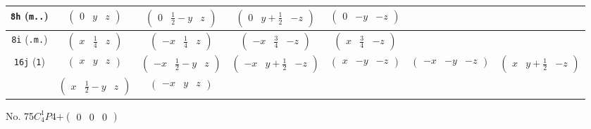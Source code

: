 \documentclass[fleqn,9pt,landscape]{jsarticle}
\begin{document}
\begin{center}
\begin{longtable}{ccccccc}
{\tt 8h} ({\tt m..}) & $ \begin{pmatrix} 0 & y & z \end{pmatrix} $ & $ \begin{pmatrix} 0 & \frac{1}{2} - y & z \end{pmatrix} $ & $ \begin{pmatrix} 0 & y + \frac{1}{2} & - z \end{pmatrix} $ & $ \begin{pmatrix} 0 & - y & - z \end{pmatrix} $ & $  $ & $  $ \\ \hline
{\tt 8i} ({\tt .m.}) & $ \begin{pmatrix} x & \frac{1}{4} & z \end{pmatrix} $ & $ \begin{pmatrix} - x & \frac{1}{4} & z \end{pmatrix} $ & $ \begin{pmatrix} - x & \frac{3}{4} & - z \end{pmatrix} $ & $ \begin{pmatrix} x & \frac{3}{4} & - z \end{pmatrix} $ & $  $ & $  $ \\ \hline
{\tt 16j} ({\tt 1}) & $ \begin{pmatrix} x & y & z \end{pmatrix} $ & $ \begin{pmatrix} - x & \frac{1}{2} - y & z \end{pmatrix} $ & $ \begin{pmatrix} - x & y + \frac{1}{2} & - z \end{pmatrix} $ & $ \begin{pmatrix} x & - y & - z \end{pmatrix} $ & $ \begin{pmatrix} - x & - y & - z \end{pmatrix} $ & $ \begin{pmatrix} x & y + \frac{1}{2} & - z \end{pmatrix} $ \\
& $ \begin{pmatrix} x & \frac{1}{2} - y & z \end{pmatrix} $ & $ \begin{pmatrix} - x & y & z \end{pmatrix} $ & $  $ & $  $ & $  $ & $  $ \\
\end{longtable}
\end{center}
\newpage
No. 75\quad$C_{4}^{1}$\quad$P4$\quad[ tetragonal ]\quad$+\begin{pmatrix} 0 & 0 & 0 \end{pmatrix}$
\end{document}

